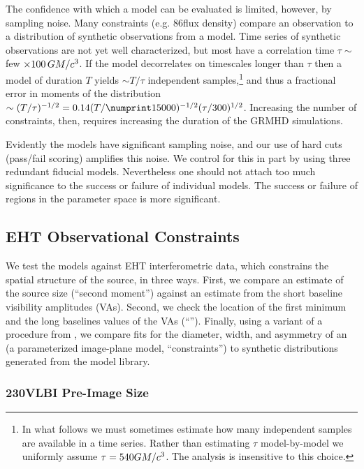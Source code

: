 The confidence with which a model can be evaluated is limited, however, by sampling noise.
Many constraints (e.g. 86\GHz flux density) compare an observation to a distribution of synthetic observations from a model.
Time series of synthetic observations are not yet well characterized, but most have a correlation time $\tau\sim$ few $\times 100\,GM/c^3$.
If the model decorrelates on timescales longer than $\tau$ then a model of duration $T$ yields $\sim T/\tau$ independent samples,\footnote{In what follows we must sometimes estimate how many independent samples are available in a time series.
Rather than estimating $\tau$  model-by-model we uniformly assume $\tau = 540 GM/c^3$.
The analysis is insensitive to this choice.} and thus a fractional error in moments of the distribution $\sim (T/\tau)^{-1/2} = 0.14 (T/\no{15000})^{-1/2}(\tau/300)^{1/2}$.
Increasing the number of constraints, then, requires increasing the duration of the GRMHD simulations.

Evidently the models have significant sampling noise, and our use of hard cuts (pass/fail scoring) amplifies this noise.
We control for this in part by using three redundant fiducial models.
Nevertheless one should not attach too much significance to the success or failure of individual models.
The success or failure of regions in the parameter space is more significant.

\subsection{EHT Observational Constraints}

We test the models against EHT interferometric data, which constrains
the spatial structure of the source, in three ways.
First, we compare an estimate of the source size (``second moment'')
against an estimate from the short baseline visibility amplitudes
(VAs).
Second, we check the location of the first minimum and the long
baselines values of the VAs (``\vam'').
Finally, using a variant of a procedure from , we
compare fits for the diameter, width, and asymmetry of an \mring (a
parameterized image-plane model, ``\mring constraints'') to synthetic
distributions generated from the model library.

\subsubsection{230\GHz VLBI Pre-Image Size}
\label{sec:sz}

